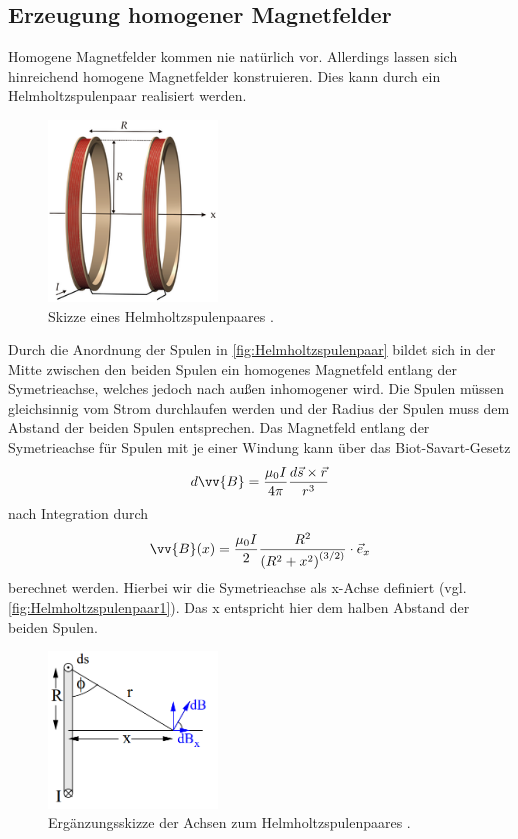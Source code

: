 \subsection{Erzeugung homogener Magnetfelder}
\label{subsec:HomogeneMagnetfelder}
Homogene Magnetfelder kommen nie natürlich vor. Allerdings lassen sich hinreichend homogene Magnetfelder konstruieren. Dies kann durch ein Helmholtzspulenpaar realisiert werden.
\begin{figure}
	\centering
    \includegraphics[width=0.4\textwidth]{content/Helmholtz_coils.png}
	\caption{Skizze eines Helmholtzspulenpaares \cite{Helmholtzspulenpaar}.}
	\label{fig:Helmholtzspulenpaar}
\end{figure}
Durch die Anordnung der Spulen in \autoref{fig:Helmholtzspulenpaar} bildet sich in der Mitte zwischen den beiden Spulen ein homogenes Magnetfeld entlang der Symetrieachse, welches 
jedoch nach außen inhomogener wird. Die Spulen müssen gleichsinnig vom Strom durchlaufen werden und der Radius der Spulen muss dem Abstand der beiden Spulen entsprechen. 
Das Magnetfeld entlang der Symetrieachse für Spulen mit je einer Windung kann über das Biot-Savart-Gesetz
\begin{equation*}
    \label{eqn:diff_Biot-Savart}
    d\vv{B} = \frac{\mu_0 I}{4\pi}\frac{d\vec{s}\times\vec{r}}{r^3}
\end{equation*}
nach Integration durch
\begin{equation*}
    \label{eqn:Biot-Savart_1}
    \vv{B}(x) = \frac{\mu_0 I}{2}\frac{R^2}{\left(R^2 + x^2 \right)^{(3/2)}}\cdot \vec{e}_x
\end{equation*}
berechnet werden. Hierbei wir die Symetrieachse als x-Achse definiert (vgl. \autoref{fig:Helmholtzspulenpaar1}). Das \dq x\dq \: entspricht hier dem halben Abstand der beiden Spulen. 
\begin{figure}
	\centering
    \includegraphics[width=0.4\textwidth]{content/Helmholtzachsen.PNG}
	\caption{Ergänzungsskizze der Achsen zum Helmholtzspulenpaares  \cite{v105}.}
	\label{fig:Helmholtzspulenpaar1}
\end{figure}

